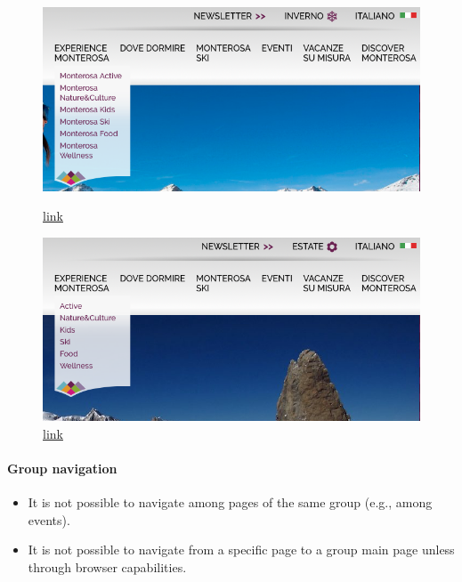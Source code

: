 \documentclass[a4paper, 11pt, parskip=half, headsepline]{scrreprt}
\begin{document}
\begin{figure}[H]
    \begin{minipage}[t]{0.5\textwidth}
        \centering
        \includegraphics[width=1\linewidth, keepaspectratio]{15-interaction-consistency}
        \caption{\href{https://www.visitmonterosa.com}{link}}
        \label{fig:interaction-consistency-05}
    \end{minipage}   
    \hspace*{\fill}
    \begin{minipage}[t]{0.5\textwidth}
        \centering
        \includegraphics[width=1\linewidth, keepaspectratio]{16-interaction-consistency}
        \caption{\href{https://www.visitmonterosa.com/?season=summer}{link}}
        \label{fig:interaction-consistency-06}
    \end{minipage} 
\end{figure}

\paragraph{Group navigation}
\begin{itemize}
    \item It is not possible to navigate among pages of the same group (e.g., among events).
    \item It is not possible to navigate from a specific page to a group main page unless through browser capabilities.
\end{itemize}
\end{document}
